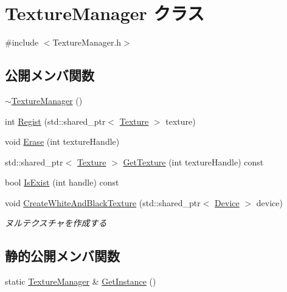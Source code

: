 \hypertarget{class_texture_manager}{}\section{Texture\+Manager クラス}
\label{class_texture_manager}


{\ttfamily \#include $<$Texture\+Manager.\+h$>$}

\subsection*{公開メンバ関数}
\begin{DoxyCompactItemize}
\item 
\mbox{\hyperlink{class_texture_manager_a001d6d74674961db79987e3222682576}{$\sim$\+Texture\+Manager}} ()
\item 
int \mbox{\hyperlink{class_texture_manager_a390fd4dc7b2b2e1898a7239b1a8dd26d}{Regist}} (std\+::shared\+\_\+ptr$<$ \mbox{\hyperlink{class_texture}{Texture}} $>$ texture)
\item 
void \mbox{\hyperlink{class_texture_manager_abda8c00abcd513182e6447943d1b6808}{Erase}} (int texture\+Handle)
\item 
std\+::shared\+\_\+ptr$<$ \mbox{\hyperlink{class_texture}{Texture}} $>$ \mbox{\hyperlink{class_texture_manager_a8995fa4f73ade280992c56f47b8d6d9d}{Get\+Texture}} (int texture\+Handle) const
\item 
bool \mbox{\hyperlink{class_texture_manager_a2de3668d0dd69fc973a53bdc8508d586}{Is\+Exist}} (int handle) const
\item 
void \mbox{\hyperlink{class_texture_manager_a3266462ce0ac2bd4e6bad6977df92143}{Create\+White\+And\+Black\+Texture}} (std\+::shared\+\_\+ptr$<$ \mbox{\hyperlink{class_device}{Device}} $>$ device)
\begin{DoxyCompactList}\small\item\em ヌルテクスチャを作成する \end{DoxyCompactList}\end{DoxyCompactItemize}
\subsection*{静的公開メンバ関数}
\begin{DoxyCompactItemize}
\item 
static \mbox{\hyperlink{class_texture_manager}{Texture\+Manager}} \& \mbox{\hyperlink{class_texture_manager_adf67537a12b9a757c363cacbd3d20b56}{Get\+Instance}} ()
\end{DoxyCompactItemize}
